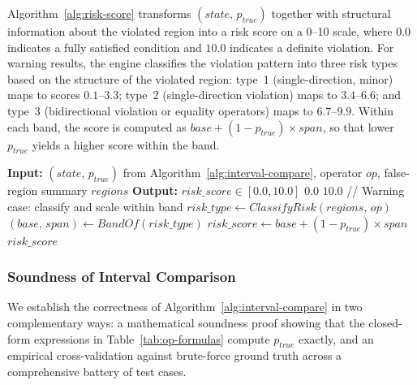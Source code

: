 \documentclass[pdflatex,sn-basic]{sn-jnl}%
\theoremstyle{thmstyleone}%
\theoremstyle{thmstyletwo}%
\theoremstyle{thmstylethree}%
\begin{document}
Algorithm~\ref{alg:risk-score} transforms $(\mathit{state},\, p_{\mathit{true}})$ together with structural information about the violated region into a risk score on a 0--10 scale, where $0.0$ indicates a fully satisfied condition and $10.0$ indicates a definite violation.
For warning results, the engine classifies the violation pattern into three risk types based on the structure of the violated region: type~1 (single-direction, minor) maps to scores $0.1$--$3.3$; type~2 (single-direction violation) maps to $3.4$--$6.6$; and type~3 (bidirectional violation or equality operators) maps to $6.7$--$9.9$.
Within each band, the score is computed as $\mathit{base} + (1 - p_{\mathit{true}}) \times \mathit{span}$, so that lower $p_{\mathit{true}}$ yields a higher score within the band.

\begin{algorithm}[t]
\caption{Risk Scoring}
\label{alg:risk-score}
\begin{algorithmic}[1]
\State \textbf{Input:} $(\mathit{state},\, p_{\mathit{true}})$ from Algorithm~\ref{alg:interval-compare}, operator $op$, false-region summary $\mathit{regions}$
\State \textbf{Output:} $\mathit{risk\_score} \in [0.0, 10.0]$
\Statex
{}
    \State \Return $0.0$
    \State \Return $10.0$
\EndIf
\Statex
\Statex // Warning case: classify and scale within band
\State $\mathit{risk\_type} \gets ClassifyRisk(\mathit{regions},\, op)$
\State $(\mathit{base},\, \mathit{span}) \gets BandOf(\mathit{risk\_type})$ 
\State $\mathit{risk\_score} \gets \mathit{base} + (1 - p_{\mathit{true}}) \times \mathit{span}$
\State \Return $\mathit{risk\_score}$
\end{algorithmic}
\end{algorithm}

\subsubsection{Soundness of Interval Comparison}\label{sec:soundness}

We establish the correctness of Algorithm~\ref{alg:interval-compare} in two complementary ways: a mathematical soundness proof showing that the closed-form expressions in Table~\ref{tab:op-formulas} compute $p_{\mathit{true}}$ exactly, and an empirical cross-validation against brute-force ground truth across a comprehensive battery of test cases.
\end{document}
